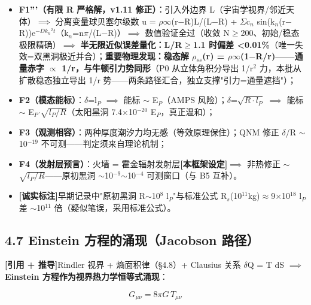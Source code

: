 \documentclass[12pt]{article}
\newcommand{\mtag}[1]{\textbf{[#1]}}
\newcommand{\up}[1]{\ensuremath{^{#1}}}
\newcommand{\down}[1]{\ensuremath{_{#1}}}
\begin{document}
\begin{itemize}
\item \textbf{F1'''（有限 R 严格解，v1.11 修正）}：引入外边界 L（宇宙学视界/邻近天体）\ensuremath{\implies} 分离变量球贝塞尔级数 u = \ensuremath{\rho}\ensuremath{\infty}(r\ensuremath{-}R)L/(L\ensuremath{-}R) + \ensuremath{\Sigma}c\down{n} sin(k\down{n}(r\ensuremath{-}R))e\up{-Dk\down{n}^{2}t}（k\down{n}=n\ensuremath{\pi}/(L\ensuremath{-}R)）\ensuremath{\implies} 数值验证全过（收敛 N\ensuremath{\geq}200、初始/稳态极限精确）\ensuremath{\implies} \textbf{半无限近似误差量化：L/R\ensuremath{\geq}1.1 时偏差 <0.01\%}（唯一失效=双黑洞极近并合）；\textbf{重要物理发现：稳态解 \ensuremath{\rho}\down{ss}(r) = \ensuremath{\rho}\ensuremath{\infty}(1\ensuremath{-}R/r)------通量赤字 \ensuremath{\propto} 1/r，与牛顿引力势同形}（P0 从立体角积分导出 1/r\up{2} 力，本批从扩散稳态独立导出 1/r 势------两条路径汇合，独立支撑"引力=通量遮挡"）；
\item \textbf{F2（模态能标）}：\ensuremath{\delta}=l\down{P} \ensuremath{\implies} 能标 \ensuremath{\sim} E\down{P}（AMPS 风险）；\ensuremath{\delta}=\ensuremath{\sqrt{R\cdot{}l\down{P}}} \ensuremath{\implies} 能标 \ensuremath{\sim} E\down{P}\ensuremath{\cdot}\ensuremath{\sqrt{l\down{P}/R}}（太阳黑洞 7.4\ensuremath{\times}10\up{-20} E\down{P}，真正温和）；
\item \textbf{F3（观测相容）}：两种厚度潮汐力均无感（等效原理保住）；QNM 修正 \ensuremath{\delta}/R \ensuremath{\sim} 10\up{-19} 不可测------判定须来自理论机制；
\item \textbf{F4（发射层预言）}：火墙 = 霍金辐射发射层\mtag{本框架设定}\ensuremath{\implies} 非热修正 \ensuremath{\sim} \ensuremath{\sqrt{l\down{P}/R}}------原初黑洞 \ensuremath{\sim}10\up{-9}\ensuremath{\sim}10\up{-4} 可测窗口（与 B5 互补）。
\item \mtag{诚实标注}早期记录中"原初黑洞 R\ensuremath{\sim}10\up{8} l\down{P}"与标准公式 R\down{s}(10\up{11}kg)\ensuremath{\approx}9\ensuremath{\times}10\up{18} l\down{P} 差 \ensuremath{\sim}10\up{11} 倍（疑似笔误，采用标准公式）。
\end{itemize}

\subsection{4.7 Einstein 方程的涌现（Jacobson 路径）}

\mtag{引用 + 推导}Rindler 视界 + 熵面积律（\S{}4.8）+ Clausius 关系 \ensuremath{\delta}Q = T dS \ensuremath{\implies} \textbf{Einstein 方程作为视界热力学恒等式涌现}：

\[G_{\mu\nu} = 8\pi G\,T_{\mu\nu}\]
\end{document}
